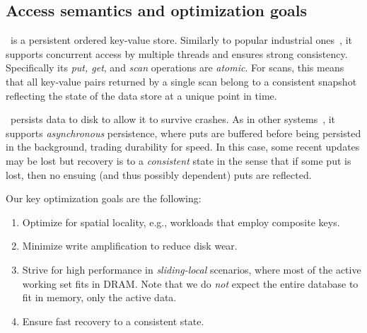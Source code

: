 
\subsection{Access semantics and optimization goals}
\sys\ is a persistent ordered key-value store. Similarly to popular industrial ones~\cite{hbase,leveldb,RocksDB}, 
it supports concurrent access by multiple threads and ensures strong consistency. 
Specifically its \emph{put, get}, and \emph{scan} operations are \emph{atomic}.  
For scans, this means that all key-value pairs returned by a single scan belong to a consistent 
snapshot reflecting the state of the data store at a unique point in time.

\sys\ persists data to disk to allow it to survive crashes.
As in other systems~\cite{leveldb,RocksDB},  it supports
\emph{asynchronous} persistence, where puts are buffered before being persisted in the background,  
 trading durability for speed. In this case, some recent updates may be lost but 
 recovery is to a \emph{consistent} state  in the sense that 
if some put is lost, then no ensuing (and thus possibly dependent) puts are reflected.


\noindent
Our key optimization goals are the following:
\begin{enumerate}
\item Optimize for {spatial locality}, e.g., workloads that employ composite keys.
 
\item Minimize {write amplification}  to reduce disk wear.%
 
\item %
Strive for high performance in  \emph{sliding-local} scenarios, where most of the active working set fits in DRAM. 
Note that we do \emph{not} expect the entire database to fit in
memory, only the active data.  
 
\item Ensure {fast recovery} to a consistent state.  
\end{enumerate}


